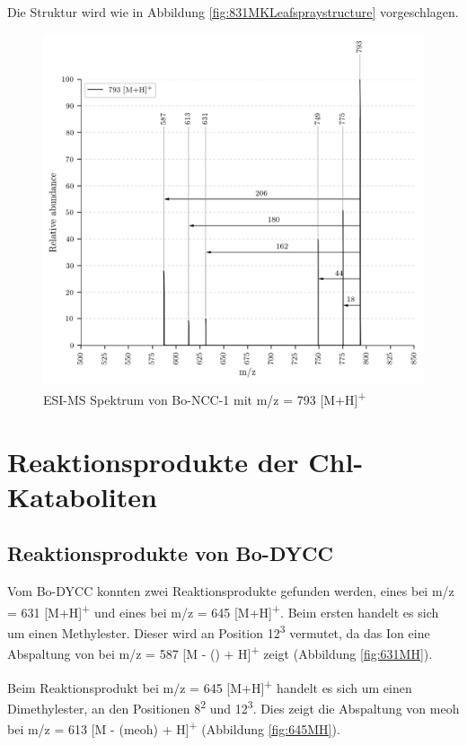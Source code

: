 Die Struktur wird wie in Abbildung \ref{fig:831MKLeafspraystructure} vorgeschlagen.

\begin{figure}[!htbp]
  \centering
  \includegraphics[width=\textwidth, height=0.7\textwidth]{figures/Kapitel7/Kataboliten/VWA_MS_793.png}
  \caption[ESI-MS Spektrum von Bo-NCC-1, Quelle: Autor]{ESI-MS Spektrum von Bo-NCC-1 mit m/z = 793 [M+H]\textsuperscript{+}}
  \label{fig:793MH}
\end{figure}



\pagebreak
\section{Reaktionsprodukte der Chl-Kataboliten}

\subsection{Reaktionsprodukte von Bo-DYCC}

Vom Bo-DYCC konnten zwei Reaktionsprodukte gefunden werden, eines bei m/z = 631 [M+H]\textsuperscript{+} und eines bei m/z = 645 [M+H]\textsuperscript{+}. Beim ersten handelt es sich um einen Methylester. Dieser wird an Position 12\textsuperscript{3} vermutet, da das Ion eine Abspaltung von  bei m/z = 587 [M - () + H]\textsuperscript{+} zeigt (Abbildung \ref{fig:631MH}). 

Beim Reaktionsprodukt bei m/z = 645 [M+H]\textsuperscript{+} handelt es sich um einen Dimethylester, an den Positionen 8\textsuperscript{2} und 12\textsuperscript{3}.  Dies zeigt die Abspaltung von \gls{meoh} bei m/z = 613 [M - (\gls{meoh}) + H]\textsuperscript{+} (Abbildung \ref{fig:645MH}). 

